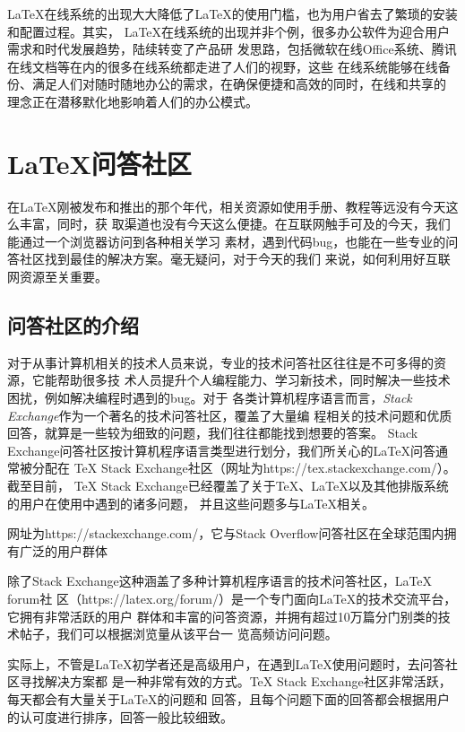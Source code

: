 LaTeX在线系统的出现大大降低了LaTeX的使用门槛，也为用户省去了繁琐的安装和配置过程。其实，
LaTeX在线系统的出现并非个例，很多办公软件为迎合用户需求和时代发展趋势，陆续转变了产品研
发思路，包括微软在线Office系统、腾讯在线文档等在内的很多在线系统都走进了人们的视野，这些
在线系统能够在线备份、满足人们对随时随地办公的需求，在确保便捷和高效的同时，在线和共享的
理念正在潜移默化地影响着人们的办公模式。

\section{\LaTeX 问答社区}
在LaTeX刚被发布和推出的那个年代，相关资源如使用手册、教程等远没有今天这么丰富，同时，获
取渠道也没有今天这么便捷。在互联网触手可及的今天，我们能通过一个浏览器访问到各种相关学习
素材，遇到代码bug，也能在一些专业的问答社区找到最佳的解决方案。毫无疑问，对于今天的我们
来说，如何利用好互联网资源至关重要。

\subsection{问答社区的介绍}
对于从事计算机相关的技术人员来说，专业的技术问答社区往往是不可多得的资源，它能帮助很多技
术人员提升个人编程能力、学习新技术，同时解决一些技术困扰，例如解决编程时遇到的bug。对于
各类计算机程序语言而言，\emph{Stack Exchange}作为一个著名的技术问答社区，覆盖了大量编
程相关的技术问题和优质回答，就算是一些较为细致的问题，我们往往都能找到想要的答案。
Stack Exchange问答社区按计算机程序语言类型进行划分，我们所关心的LaTeX问答通常被分配在
TeX Stack Exchange社区（网址为https://tex.stackexchange.com/）。截至目前，
TeX Stack Exchange已经覆盖了关于TeX、LaTeX以及其他排版系统的用户在使用中遇到的诸多问题，
并且这些问题多与LaTeX相关。

\begin{tcolorbox}[colback=red!5!white, colframe=red!50!black, title=Stack Exchange]
      网址为https://stackexchange.com/，它与Stack Overflow问答社区在全球范围内拥有广泛的用户群体
\end{tcolorbox}

除了Stack Exchange这种涵盖了多种计算机程序语言的技术问答社区，LaTeX forum社
区（https://latex.org/forum/）是一个专门面向LaTeX的技术交流平台，它拥有非常活跃的用户
群体和丰富的问答资源，并拥有超过10万篇分门别类的技术帖子，我们可以根据浏览量从该平台一
览高频访问问题。

实际上，不管是LaTeX初学者还是高级用户，在遇到LaTeX使用问题时，去问答社区寻找解决方案都
是一种非常有效的方式。TeX Stack Exchange社区非常活跃，每天都会有大量关于LaTeX的问题和
回答，且每个问题下面的回答都会根据用户的认可度进行排序，回答一般比较细致。

